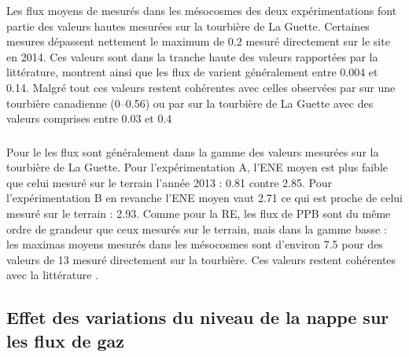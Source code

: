 Les flux moyens de \chh mesurés dans les mésocosmes des deux expérimentations font partie des valeurs hautes mesurées sur la tourbière de La Guette.
Certaines mesures dépassent nettement le maximum de \SI{0.2}{\uml} mesuré directement sur le site en 2014.
Ces valeurs sont dans la tranche haute des valeurs rapportées par la littérature, \citet{blodau2002} montrent ainsi que les flux de \chh varient généralement entre \num{0.004} et \SI{0.14}{\uml}.
Malgré tout ces valeurs restent cohérentes avec celles observées par \citet{lai2014} sur une tourbière canadienne (\num{0}--\SI{0.56}{\uml}) ou par \citet{gogo2011a} sur la tourbière de La Guette avec des valeurs comprises entre \num{0.03} et \SI{0.4}{\uml}

\subsubsection{\coo}

Pour le \coo les flux sont généralement dans la gamme des valeurs mesurées sur la tourbière de La Guette.
Pour l'expérimentation A, l'ENE moyen est plus faible que celui mesuré sur le terrain l'année 2013 : \num{0.81} contre \SI{2.85}{\uml}.
Pour l'expérimentation B en revanche l'ENE moyen vaut \SI{2.71}{\uml} ce qui est proche de celui mesuré sur le terrain : \SI{2.93}{\uml}.
Comme pour la RE, les flux de PPB sont du même ordre de grandeur que ceux mesurés sur le terrain, mais dans la gamme basse : les maximas moyens mesurés dans les mésocosmes sont d'environ \num{7.5} pour des valeurs de \SI{13}{\uml} mesuré directement sur la tourbière.
Ces valeurs restent cohérentes avec la littérature \citep{bortoluzzi2006a} \plop.

%



\subsection{Effet des variations du niveau de la nappe sur les flux de gaz}

